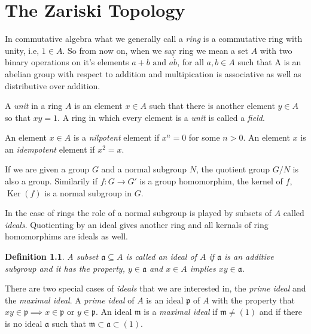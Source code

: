 \documentclass[]{report}
\newtheorem{defn}[theorem]{Definition}
\DeclareMathOperator\Ker{Ker}
\begin{document}
\chapter {The Zariski Topology}

In commutative algebra what we generally call a \textit{ring} is a commutative ring with unity, i.e, $1\in A$. So from now on, when we say ring we mean a set $A$ with two binary operations on it's elements $a + b \text{ and } a\dot b$, for all $a,b\in A$ such that A is an abelian group with respect to addition and multipication is associative as well as distributive over addition.

A \textit{unit} in a ring $A$ is an element $x\in A$ such that there is another element $y\in A$ so that $xy = 1$. A ring in which every element is a \textit{unit} is called a \textit{field}. 

An element $x\in A$ is a \textit{nilpotent} element if $x^n = 0$ for some $n>0$. An element $x$ is an \textit{idempotent} element if $x^2 = x$. 

If we are given a group $G$ and a normal subgroup $N$, the quotient group $G/N$ is also a group. Similarily if $f: G \rightarrow G'$ is a group homomorphim, the kernel of $f$, $\Ker(f)$ is a normal subgroup in $G$. 

In the case of rings the role of a normal subgroup is played by subsets of $A$ called \textit{ideals}. Quotienting by an ideal gives another ring and all kernals of ring homomorphims are ideals as well.

\begin{defn}
    A subset $\mathfrak{a} \subseteq A$ is called an \textit{ideal} of $A$ if $\mathfrak{a}$ is an additive subgroup and it has the property, $y\in \mathfrak{a}$ and $x\in A$ implies $xy\in \mathfrak{a}$.
\end{defn}

 There are two special cases of \textit{ideals} that we are interested in, the \textit{prime ideal} and the \textit{maximal ideal}. A \textit{prime ideal} of $A$  is an ideal $\mathfrak{p}$ of $A$ with the property that $xy\in \mathfrak{p} \implies x \in \mathfrak{p} \text{ or } y\in \mathfrak{p}$. An ideal $\mathfrak{m}$ is a \textit{maximal ideal} if $\mathfrak{m} \neq (1)$ and if there is no ideal $\mathfrak{a}$ such that $\mathfrak{m\subset a\subset} (1)$. 
\end{document}
